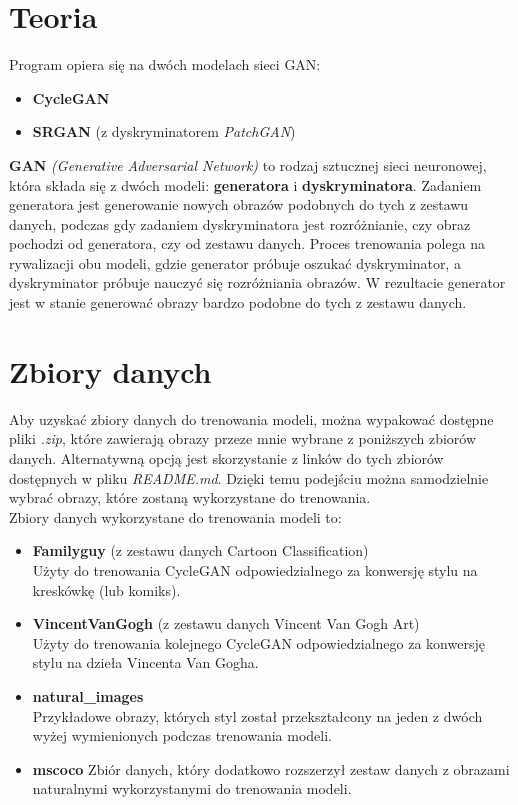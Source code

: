 \documentclass{article}
\begin{document}
\section{Teoria}
Program opiera się na dwóch modelach sieci GAN:
\begin{itemize}
    \setlength\itemsep{0pt}
    \item \textbf{CycleGAN}
    \item \textbf{SRGAN} (z dyskryminatorem \textit{PatchGAN})
\end{itemize}
\textbf{GAN} \textit{(Generative Adversarial Network)} to rodzaj sztucznej sieci neuronowej, która składa się z dwóch modeli: \textbf{generatora} i \textbf{dyskryminatora}.
Zadaniem generatora jest generowanie nowych obrazów podobnych do tych z zestawu danych, podczas gdy zadaniem dyskryminatora jest rozróżnianie, czy obraz pochodzi od generatora, czy od zestawu danych.
Proces trenowania polega na rywalizacji obu modeli, gdzie generator próbuje oszukać dyskryminator, a dyskryminator próbuje nauczyć się rozróżniania obrazów.
W rezultacie generator jest w stanie generować obrazy bardzo podobne do tych z zestawu danych.

\section{Zbiory danych}
Aby uzyskać zbiory danych do trenowania modeli, można wypakować dostępne pliki \textit{.zip}, które zawierają obrazy przeze mnie wybrane z poniższych zbiorów danych. Alternatywną opcją jest skorzystanie z linków do tych zbiorów dostępnych w pliku \textit{README.md}.
Dzięki temu podejściu można samodzielnie wybrać obrazy, które zostaną wykorzystane do trenowania.
\vspace{3mm} \\
Zbiory danych wykorzystane do trenowania modeli to:
\begin{itemize}
    \item \textbf{Familyguy} (z zestawu danych Cartoon Classification) \\
Użyty do trenowania CycleGAN odpowiedzialnego za konwersję stylu na kreskówkę (lub komiks).
    \item \textbf{VincentVanGogh} (z zestawu danych Vincent Van Gogh Art) \\
Użyty do trenowania kolejnego CycleGAN odpowiedzialnego za konwersję stylu na dzieła Vincenta Van Gogha.
    \item \textbf{natural\_images} \\
Przykładowe obrazy, których styl został przekształcony na jeden z dwóch wyżej wymienionych podczas trenowania modeli.
    \item \textbf{mscoco}
Zbiór danych, który dodatkowo rozszerzył zestaw danych z obrazami naturalnymi wykorzystanymi do trenowania modeli.
\end{itemize}
\end{document}
